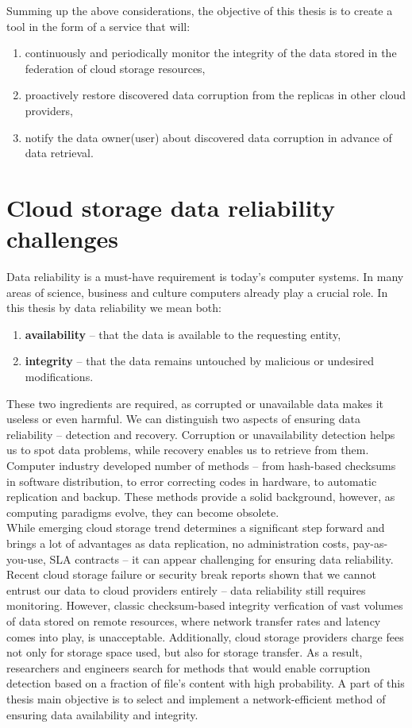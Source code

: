 Summing up the above considerations, the objective of this thesis is to create a tool
in the form of a service that will:

\begin{enumerate}
\item continuously and periodically monitor the integrity of the data stored in the
federation of cloud storage resources,
\item proactively restore discovered data corruption from the replicas in other cloud
providers,
\item notify the data owner(user) about discovered data corruption in advance of data retrieval. 
\end{enumerate}

\section{Cloud storage data reliability challenges}
Data reliability is a must-have requirement is today's computer systems. In many areas
of science, business and culture computers already play a crucial role. In this thesis
by data reliability we mean both:

\begin{enumerate}
\item \textbf{availability} -- that the data is available to the requesting entity,
\item \textbf{integrity} -- that the data remains untouched by malicious or undesired
modifications.
\end{enumerate}

These two ingredients are required, as corrupted or unavailable data makes it useless
or even harmful. We can distinguish two aspects of ensuring data reliability --
detection and recovery. Corruption or unavailability detection helps us to spot data
problems, while recovery enables us to retrieve from them. Computer industry developed
number of methods -- from hash-based checksums in software distribution, to error correcting
codes in hardware, to automatic replication and backup. These methods provide a solid
background, however, as computing paradigms evolve, they can become obsolete.\\

While emerging cloud storage trend determines a significant step forward and brings a lot
of advantages as data replication, no administration costs, pay-as-you-use, SLA contracts 
-- it can appear challenging for ensuring data reliability. Recent cloud storage failure
or security break reports shown that we cannot entrust our data to cloud providers entirely
-- data reliability still requires monitoring. However, classic checksum-based integrity
verfication of vast volumes of data stored on remote resources, where network transfer
rates and latency comes into play, is unacceptable. Additionally, cloud storage providers
charge fees not only for storage space used, but also for storage transfer. As a result,
researchers and engineers search for methods that would enable corruption detection
based on a fraction of file's content with high probability. A part of this thesis main
objective is to select and implement a network-efficient method of ensuring data availability
and integrity.

